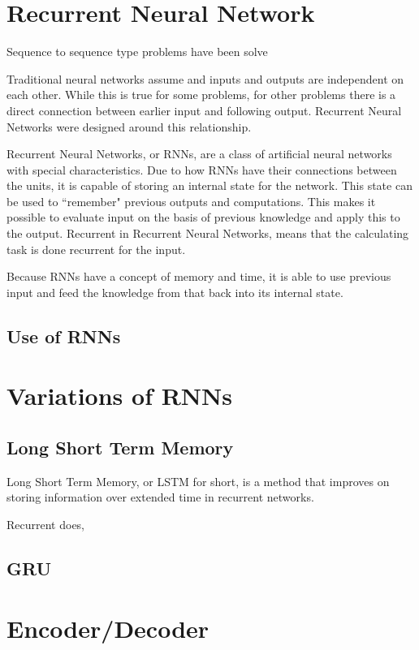 
\section{Recurrent Neural Network}
Sequence to sequence type problems have been solve

Traditional neural networks assume and inputs and outputs are independent on each other. While this is true for some problems, for other problems there is a direct connection between earlier input and following output. Recurrent Neural Networks were designed around this relationship.

Recurrent Neural Networks, or RNNs, are a class of artificial neural networks with special characteristics. Due to how RNNs have their connections between the units, it is capable of storing an internal state for the network. This state can be used to ``remember" previous outputs and computations. This makes it possible to evaluate input on the basis of previous knowledge and apply this to the output. Recurrent in Recurrent Neural Networks, means that the calculating task is done recurrent for the input.


Because RNNs have a concept of memory and time, it is able to use previous input and feed the knowledge from that back into its internal state. 

\subsection{Use of RNNs}


\section{Variations of RNNs}

\subsection{Long Short Term Memory}
Long Short Term Memory, or LSTM for short, is a method that improves on storing information over extended time in recurrent networks. 

Recurrent does, 

\cite{hochreiter1997long}

\subsection{GRU}


\section{Encoder/Decoder}

\cite{rocktaschel2015reasoning}
\fi